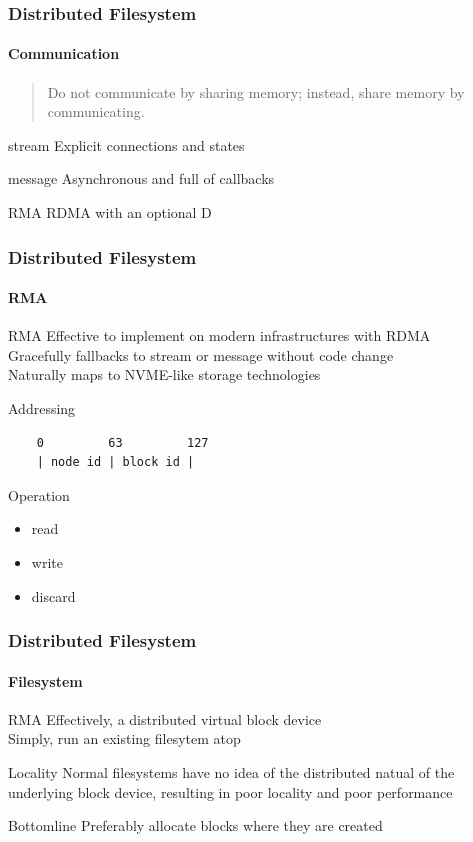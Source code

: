 \documentclass{ctexbeamer}
\begin{document}
\begin{frame}
\frametitle{Distributed Filesystem}
\framesubtitle{Communication}
\begin{verse}
  Do not communicate by sharing memory; instead, share memory by communicating.
\end{verse}
\begin{block}{stream}
  Explicit connections and states
\end{block}
\begin{block}{message}
  Asynchronous and full of callbacks
\end{block}
\begin{exampleblock}{RMA}
  RDMA with an optional D
\end{exampleblock}
\end{frame}

\begin{frame}[fragile]
\frametitle{Distributed Filesystem}
\framesubtitle{RMA}
  \begin{exampleblock}{RMA}
    Effective to implement on modern infrastructures with RDMA \\
    Gracefully fallbacks to stream or message without code change \\
    Naturally maps to NVME-like storage technologies \\
  \end{exampleblock}
  \begin{block}{Addressing}
    \begin{small}
    \begin{verbatim}
    0         63         127
    | node id | block id | \end{verbatim}
    \end{small}
  \end{block}
  \begin{block}{Operation}
    \begin{itemize}
       \item read
       \item write 
       \item discard
    \end{itemize}
  \end{block}
\end{frame}

\begin{frame}
\frametitle{Distributed Filesystem}
\framesubtitle{Filesystem}
  \begin{exampleblock}{RMA}
    Effectively, a distributed virtual block device \\
    Simply, run an existing filesytem atop
  \end{exampleblock}
  \begin{alertblock}{Locality}
    Normal filesystems have no idea of the distributed natual of the underlying block device, resulting in poor locality and poor performance
  \end{alertblock}
  \begin{block}{Bottomline}
    Preferably allocate blocks where they are created
  \end{block}
\end{frame}
\end{document}
